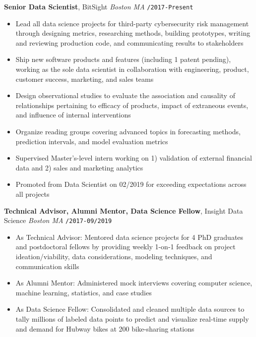 \documentclass[10pt,english]{report}
\begin{document}
\textbf{Senior Data Scientist}, BitSight \hfill \textit{Boston MA} \texttt{/2017-Present}
\begin{itemize}
    \item Lead all data science projects for third-party cybersecurity risk management through designing metrics, researching methods, building prototypes, writing and reviewing production code, and communicating results to stakeholders
    \item Ship new software products and features (including 1 patent pending), working as the sole data scientist in collaboration with engineering, product, customer success, marketing, and sales teams
    \item Design observational studies to evaluate the association and causality of relationships pertaining to efficacy of products, impact of extraneous events, and influence of internal interventions
    \item Organize reading groups covering advanced topics in forecasting methods, prediction intervals, and model evaluation metrics
    \item Supervised Master's-level intern working on 1) validation of external financial data and 2) sales and marketing analytics
    \item Promoted from Data Scientist on 02/2019 for exceeding expectations across all projects
\end{itemize}

\vspace{1mm}

\textbf{Technical Advisor, Alumni Mentor, Data Science Fellow}, Insight Data Science \hfill \textit{Boston MA} \texttt{/2017-09/2019}
\begin{itemize}
    \item As Technical Advisor: Mentored data science projects for 4 PhD graduates and postdoctoral fellows by providing weekly 1-on-1 feedback on project ideation/viability, data considerations, modeling techniques, and communication skills
    \item As Alumni Mentor: Administered mock interviews covering computer science, machine learning, statistics, and case studies
    \item As Data Science Fellow: Consolidated and cleaned multiple data sources to tally millions of labeled data points to predict and visualize real-time supply and demand for Hubway bikes at 200 bike-sharing stations
\end{itemize}
\end{document}

